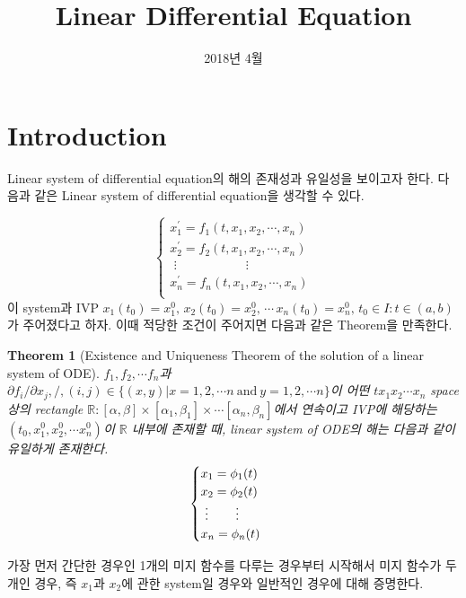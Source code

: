 \documentclass[a4paper,10pt]{article}
\date{2018년 4월}
\title{Linear Differential Equation}
\newtheorem{theorem}{Theorem}[section]
\begin{document}
    \maketitle
    \section{Introduction}
    Linear system of differential equation의 해의 존재성과 유일성을 보이고자 한다. 다음과 같은 Linear system of differential equation을 생각할 수 있다.
    
    \begin{equation}
        \begin{cases}
        x_1^{\prime} = f_1(t, x_1, x_2, \cdots, x_n) \\
        x_2^{\prime} = f_2(t, x_1, x_2, \cdots, x_n) \\
        \,\, \vdots \qquad\qquad\quad\, \, \, \vdots \\
        x_n^{\prime} = f_n(t, x_1, x_2, \cdots, x_n) \\
        \end{cases}
    \end{equation}
    이 system과 IVP $x_1(t_0) = x_1^0, \, x_2(t_0) = x_2^0, \, \cdots \, x_n(t_0) = x_n^0,\, t_0 \in I: t \in (a, b)$가 주어졌다고 하자. 이때 적당한 조건이 주어지면 다음과 같은 Theorem을 만족한다.\newline
    \begin{theorem}[Existence and Uniqueness Theorem of the solution of a linear system of ODE]
    \label{ode}
    $f_1, f_2, \cdots f_n$과 $\partial f_i/\partial x_j, /, (i,j) \in \{(x,y) | x = 1, 2, \cdots n \ \text{and} \ y = 1, 2, \cdots n\}$이 어떤 $tx_1x_2\cdots x_n$ space 상의 rectangle $\mathbb{R}: [ \alpha, \beta ] \times [ \alpha_1, \beta_1 ] \times \cdots [ \alpha_n, \beta_n ]$에서 연속이고 IVP에 해당하는 $(t_0, x_1^0, x_2^0, \cdots x_n^0 )$이 $\mathbb{R}$ 내부에 존재할 때, linear system of ODE의 해는 다음과 같이 유일하게 존재한다.
    \begin{equation}
        \begin{cases}
        x_1 = \phi_1(t) \\
        x_2 = \phi_2(t) \\
        \,\, \vdots \qquad \, \vdots\\
        x_n = \phi_n(t) \\
        \end{cases}
        \newline
    \end{equation}
    \end{theorem}
    가장 먼저 간단한 경우인 1개의 미지 함수를 다루는 경우부터 시작해서 미지 함수가 두 개인 경우, 즉 $x_1$과 $x_2$에 관한 system일 경우와 일반적인 경우에 대해 증명한다.
    
\end{document}
